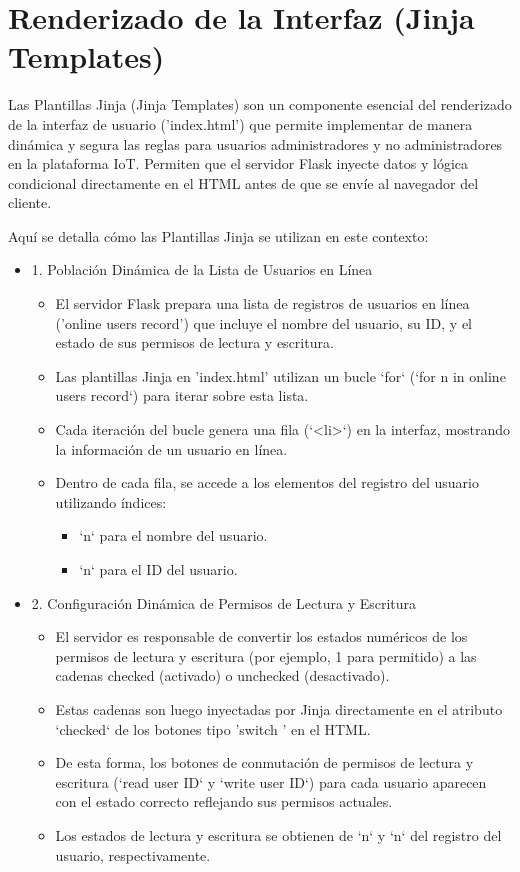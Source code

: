 \documentclass{report}
\begin{document}
\section{Renderizado de la Interfaz (Jinja Templates)}
Las  Plantillas Jinja (Jinja Templates)  son un componente esencial del  renderizado de la interfaz de usuario ('index.html')  que permite implementar 
de manera dinámica y segura las  reglas para usuarios administradores y no administradores  en la plataforma IoT. Permiten que el servidor Flask inyecte 
datos y lógica condicional directamente en el HTML antes de que se envíe al navegador del cliente.

Aquí se detalla cómo las Plantillas Jinja se utilizan en este contexto:
\begin{itemize}
    \item 1. Población Dinámica de la Lista de Usuarios en Línea
    \begin{itemize}
        \item El servidor Flask prepara una lista de registros de usuarios en línea ('online users record') que incluye el nombre del usuario, 
              su ID, y el estado de sus permisos de lectura y escritura.
        \item Las plantillas Jinja en 'index.html' utilizan un bucle `for` (`for n in online users record`) para iterar sobre esta lista.
        \item Cada iteración del bucle genera una fila (`<li>`) en la interfaz, mostrando la información de un usuario en línea.
        \item Dentro de cada fila, se accede a los elementos del registro del usuario utilizando índices:
        \begin{itemize}
            \item `n` para el  nombre del usuario.
            \item `n` para el  ID del usuario.
        \end{itemize}
    \end{itemize}

    \item 2. Configuración Dinámica de Permisos de Lectura y Escritura
    \begin{itemize}
        \item El servidor es responsable de convertir los estados numéricos de los permisos de lectura y escritura (por ejemplo, 1 para permitido) a 
              las cadenas checked (activado) o unchecked (desactivado).
        \item Estas cadenas son luego inyectadas por Jinja directamente en el atributo `checked` de los botones tipo  'switch ' en el HTML.
        \item De esta forma, los botones de conmutación de permisos de lectura y escritura (`read user ID` y `write user ID`) para cada usuario 
              aparecen con el estado correcto reflejando sus permisos actuales.
        \item Los estados de lectura y escritura se obtienen de `n` y `n` del registro del usuario, respectivamente.
    \end{itemize}


\end{itemize}
\end{document}

